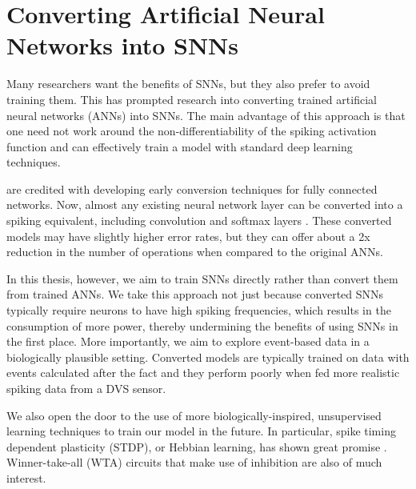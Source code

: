 \documentclass [MS] {UCLAthesis}
\begin{document}


\section{Converting Artificial Neural Networks into SNNs}

Many researchers want the benefits of SNNs, but they also prefer to avoid training them. This has prompted research into converting trained artificial neural networks (ANNs) into SNNs. The main advantage of this approach is that one need not work around the non-differentiability of the spiking activation function and can effectively train a model with standard deep learning techniques.

\citet{convert_no_bias} are credited with developing early conversion techniques for fully connected networks. Now, almost any existing neural network layer can be converted into a spiking equivalent, including convolution and softmax layers \citep{convert_with_bias}. These converted models may have slightly higher error rates, but they can offer about a 2x reduction in the number of operations when compared to the original ANNs.

In this thesis, however, we aim to train SNNs directly rather than convert them from trained ANNs. We take this approach not just because converted SNNs typically require neurons to have high spiking frequencies, which results in the consumption of more power, thereby undermining the benefits of using SNNs in the first place. More importantly, we aim to explore event-based data in a biologically plausible setting. Converted models are typically trained on data with events calculated after the fact and they perform poorly when fed more realistic spiking data from a DVS sensor.

We also open the door to the use of more biologically-inspired, unsupervised learning techniques to train our model in the future. In particular, spike timing dependent plasticity (STDP), or Hebbian learning, has shown great promise \citep{KHERADPISHEH201856}. Winner-take-all (WTA) circuits that make use of inhibition are also of much interest.

\end{document}
